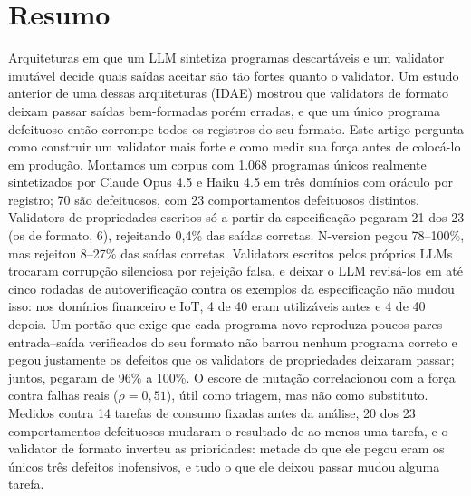 \documentclass[sigconf,nonacm]{acmart}
\begin{document}
\begin{abstract}
\begin{otherlanguage}{english}
\end{otherlanguage}
\end{abstract}


\frenchspacing
\maketitle

\section*{Resumo}
Arquiteturas em que um LLM sintetiza programas descartáveis e um validator imutável decide quais saídas aceitar são tão fortes quanto o validator. Um estudo anterior de uma dessas arquiteturas (IDAE) mostrou que validators de formato deixam passar saídas bem-formadas porém erradas, e que um único programa defeituoso então corrompe todos os registros do seu formato. Este artigo pergunta como construir um validator mais forte e como medir sua força antes de colocá-lo em produção. Montamos um corpus com 1.068 programas únicos realmente sintetizados por Claude Opus 4.5 e Haiku 4.5 em três domínios com oráculo por registro; 70 são defeituosos, com 23 comportamentos defeituosos distintos. Validators de propriedades escritos só a partir da especificação pegaram 21 dos 23 (os de formato, 6), rejeitando 0,4\% das saídas corretas. N-version pegou 78--100\%, mas rejeitou 8--27\% das saídas corretas. Validators escritos pelos próprios LLMs trocaram corrupção silenciosa por rejeição falsa, e deixar o LLM revisá-los em até cinco rodadas de autoverificação contra os exemplos da especificação não mudou isso: nos domínios financeiro e IoT, 4 de 40 eram utilizáveis antes e 4 de 40 depois. Um portão que exige que cada programa novo reproduza poucos pares entrada--saída verificados do seu formato não barrou nenhum programa correto e pegou justamente os defeitos que os validators de propriedades deixaram passar; juntos, pegaram de 96\% a 100\%. O escore de mutação correlacionou com a força contra falhas reais ($\rho = 0{,}51$), útil como triagem, mas não como substituto. Medidos contra 14 tarefas de consumo fixadas antes da análise, 20 dos 23 comportamentos defeituosos mudaram o resultado de ao menos uma tarefa, e o validator de formato inverteu as prioridades: metade do que ele pegou eram os únicos três defeitos inofensivos, e tudo o que ele deixou passar mudou alguma tarefa.
\end{document}
